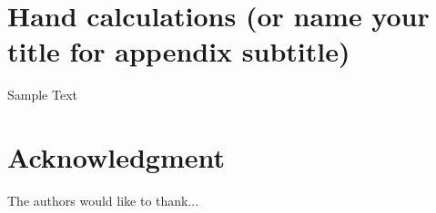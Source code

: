 \documentclass[journal]{IEEEtran}
\begin{document}
\appendices
\section{Hand calculations (or name your title for appendix subtitle)}

Sample Text

\section*{Acknowledgment}
The authors would like to thank...




%
%
%


\printbibliography

\end{document}
